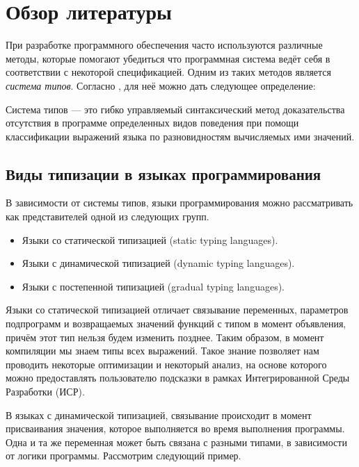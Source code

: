 \section{Обзор литературы}

При разработке программного обеспечения часто используются различные методы, которые помогают убедиться что программная система ведёт себя в соответствии с некоторой спецификацией. Одним из таких методов является \textit{система типов}. Согласно \cite{book:pierce2002types}, для неё можно дать следующее определение:


\begin{definition}
Система типов --- это гибко управляемый синтаксический метод доказательства отсутствия в программе определенных видов поведения при помощи классификации выражений языка по разновидностям вычисляемых ими значений.
\end{definition}


\subsection{Виды типизации в языках программирования}

В зависимости от системы типов, языки программирования можно рассматривать как представителей одной из следующих групп.
\begin{itemize}
\item Языки со статической типизацией (static typing languages).
\item Языки с динамической типизацией (dynamic typing languages).
\item Языки с постепенной типизацией (gradual typing  languages).
\end{itemize}



Языки со статической типизацией отличает связывание переменных, параметров подпрограмм и возвращаемых значений функций с типом в момент объявления, причём этот тип нельзя будем изменить позднее. Таким образом, в момент компиляции мы знаем типы всех выражений. Такое знание позволяет нам проводить некоторые оптимизации и некоторый анализ, на основе которого можно предоставлять пользователю подсказки в рамках Интегрированной Среды Разработки (ИСР).

В языках с динамической типизацией, связывание происходит в момент присваивания значения, которое выполняется во время выполнения программы. Одна и та же переменная может быть связана с разными типами, в зависимости от логики программы. Рассмотрим следующий пример.


